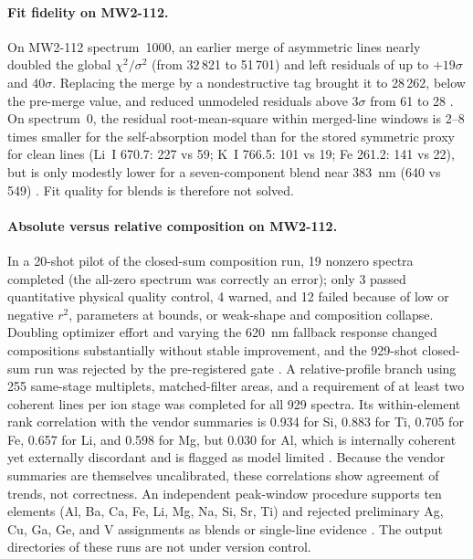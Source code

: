 \paragraph{Fit fidelity on MW2-112.}
On MW2-112 spectrum~1000, an earlier merge of asymmetric lines nearly doubled the global $\chi^2/\sigma^2$ (from 32\,821 to 51\,701) and left residuals of up to $+19\sigma$ and $40\sigma$. Replacing the merge by a nondestructive tag brought it to 28\,262, below the pre-merge value, and reduced unmodeled residuals above $3\sigma$ from 61 to 28 %
. On spectrum~0, the residual root-mean-square within merged-line windows is 2--8 times smaller for the self-absorption model than for the stored symmetric proxy for clean lines (Li~I 670.7: 227 vs 59; K~I 766.5: 101 vs 19; Fe 261.2: 141 vs 22), but is only modestly lower for a seven-component blend near \SI{383}{\nano\metre} (640 vs 549) %
. Fit quality for blends is therefore not solved.

\paragraph{Absolute versus relative composition on MW2-112.}
In a 20-shot pilot of the closed-sum composition run, 19 nonzero spectra completed (the all-zero spectrum was correctly an error); only 3 passed quantitative physical quality control, 4 warned, and 12 failed because of low or negative $r^2$, parameters at bounds, or weak-shape and composition collapse. Doubling optimizer effort and varying the \SI{620}{\nano\metre} fallback response changed compositions substantially without stable improvement, and the 929-shot closed-sum run was rejected by the pre-registered gate %
. A relative-profile branch using 255 same-stage multiplets, matched-filter areas, and a requirement of at least two coherent lines per ion stage was completed for all 929 spectra. Its within-element rank correlation with the vendor summaries is 0.934 for Si, 0.883 for Ti, 0.705 for Fe, 0.657 for Li, and 0.598 for Mg, but 0.030 for Al, which is internally coherent yet externally discordant and is flagged as model limited %
. Because the vendor summaries are themselves uncalibrated, these correlations show agreement of trends, not correctness. An independent peak-window procedure supports ten elements (Al, Ba, Ca, Fe, Li, Mg, Na, Si, Sr, Ti) and rejected preliminary Ag, Cu, Ga, Ge, and V assignments as blends or single-line evidence %
. The output directories of these runs are not under version control.

